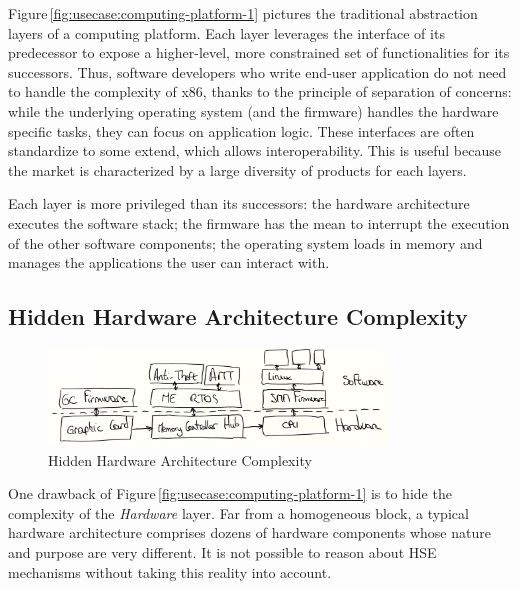 Figure\,\ref{fig:usecase:computing-platform-1} pictures the traditional
abstraction layers of a computing platform.
%
Each layer leverages the interface of its predecessor to expose a higher-level,
more constrained set of functionalities for its successors.
%
Thus, software developers who write end-user application do not need to handle
the complexity of x86, thanks to the principle of separation of concerns: while
the underlying operating system (and the firmware) handles the hardware specific
tasks, they can focus on application logic.
%
These interfaces are often standardize to some extend, which allows
interoperability.
%
This is useful because the market is characterized by a large diversity of
products for each layers.

Each layer is more privileged than its successors:
%
the hardware architecture executes the software stack;
%
the firmware has the mean to interrupt the execution of the other software
components;
%
the operating system loads in memory and manages the applications the user can
interact with.

\subsection{Hidden Hardware Architecture Complexity}

\begin{figure}
  \centering
  \includegraphics[width=0.8\textwidth]{Figures/intro-computing-platform.jpg}
  \caption{Hidden Hardware Architecture Complexity}
  \label{fig:usecase:computing-platform-2}
\end{figure}

One drawback of Figure\,\ref{fig:usecase:computing-platform-1} is to hide the
complexity of the \emph{Hardware} layer.
%
Far from a homogeneous block, a typical hardware architecture comprises dozens
of hardware components whose nature and purpose are very different.
%
It is not possible to reason about HSE mechanisms without taking this reality
into account.

